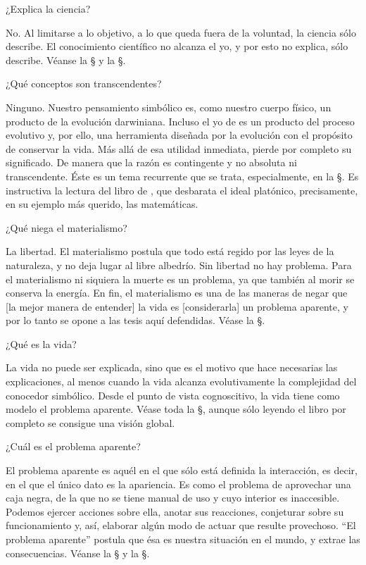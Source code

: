 \Q ¿Explica la ciencia?

No.  Al limitarse a lo objetivo, a lo que queda fuera de la voluntad, la
ciencia sólo describe.  El conocimiento científico no alcanza el yo, y por
esto no explica, sólo describe.  Véanse la \S{} y la
\S{}.

\Q ¿Qué conceptos son transcendentes?

Ninguno. Nuestro pensamiento simbólico es, como nuestro cuerpo físico,
un producto de la evolución darwiniana. Incluso el yo de
 es un producto del proceso evolutivo y, por ello, una
herramienta diseñada por la evolución con el propósito de conservar la vida.
Más allá de esa utilidad inmediata, pierde por completo su significado.  De
manera que la razón es contingente y no absoluta ni transcendente.  Éste es
un tema recurrente que se trata, especialmente, en la \S{}.
Es instructiva la lectura del libro de
\cite{Lakatos1976}, que desbarata el ideal platónico,
precisamente, en su ejemplo más querido, las matemáticas.

\Q ¿Qué niega el materialismo?

La libertad.  El materialismo postula que todo está regido por las leyes de
la naturaleza, y no deja lugar al libre albedrío.  Sin libertad no hay
problema.  Para el materialismo ni siquiera la muerte es un problema, ya que
también al morir se conserva la energía.  En fin, el materialismo es una de
las maneras de negar que [la mejor manera de entender] la vida es
[considerarla] un problema aparente, y por lo tanto se opone a las tesis
aquí defendidas.  Véase la \S{}.

\Q ¿Qué es la vida?

La vida no puede ser explicada, sino que es el motivo que hace necesarias
las explicaciones, al menos cuando la vida alcanza evolutivamente la
complejidad del conocedor simbólico.  Desde el punto de vista cognoscitivo,
la vida tiene como modelo el problema aparente.  Véase toda la \S{}, aunque sólo leyendo el libro por completo se consigue una visión
global.

\Q ¿Cuál es el problema aparente?

El problema aparente es aquél en el que sólo está definida la interacción,
es decir, en el que el único dato es la apariencia.  Es como el problema de
aprovechar una caja negra, de la que no se tiene manual de uso y cuyo
interior es inaccesible.  Podemos ejercer acciones sobre ella, anotar sus
reacciones, conjeturar sobre su funcionamiento y, así, elaborar algún modo
de actuar que resulte provechoso.  ``El problema aparente'' postula que ésa
es nuestra situación en el mundo, y extrae las consecuencias.  Véanse la
\S{} y la \S{}.


